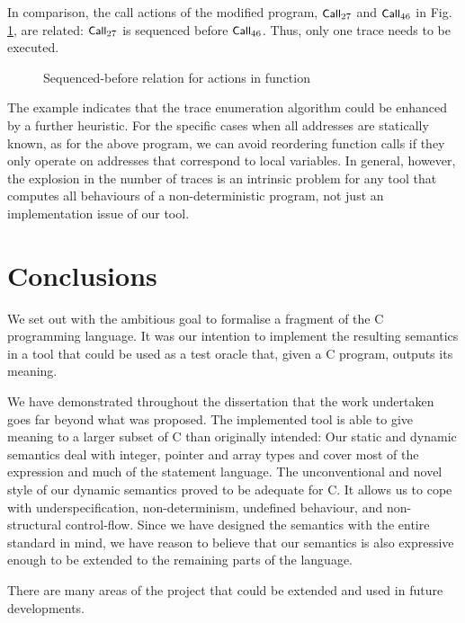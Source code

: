 \documentclass[a4paper,12pt]{scrbook}
\theoremstyle{plain}
\theoremstyle{definition}
\newcommand{\sem}[1]{{\small{\textsf{#1}}}}
\newcommand{\cc}[1]{{\text{\footnotesize\ttfamily{#1}}}}
\begin{document}
In comparison, the call actions of the modified program, $\sem{Call}_{27}$ and
$\sem{Call}_{46}$ in Fig. \ref{fibModFib}, are related: $\sem{Call}_{27}$ is
sequenced before $\sem{Call}_{46}$. Thus, only one trace needs to be executed.
\begin{figure}[htb]
\centering
\caption{Sequenced-before relation for actions in function \cc{fib}}
\label{fibModFib}
\end{figure}
The example indicates that the trace enumeration algorithm could be enhanced by
a further heuristic.  For the specific cases when all addresses are statically
known, as for the above program, we can avoid reordering function calls if they
only operate on addresses that correspond to local variables. In general,
however, the explosion in the number of traces is an intrinsic problem for any
tool that computes all behaviours of a non-deterministic program, not just an
implementation issue of our tool.

\chapter{Conclusions}
We set out with the ambitious goal to formalise a fragment of the C programming
language. It was our intention to implement the resulting semantics in a tool
that could be used as a test oracle that, given a C program, outputs its
meaning.

We have demonstrated throughout the dissertation that the work undertaken goes
far beyond what was proposed. The implemented tool is able to give meaning to a
larger subset of C than originally intended: Our static and dynamic semantics
deal with integer, pointer and array types and cover most of the expression and
much of the statement language. The unconventional and novel style of our
dynamic semantics proved to be adequate for C. It allows us to cope with
underspecification, non-determinism, undefined behaviour, and non-structural
control-flow. Since we have designed the semantics with the entire standard in
mind, we have reason to believe that our semantics is also expressive enough to
be extended to the remaining parts of the language.

There are many areas of the project that could be extended and used in future
developments.
\end{document}
